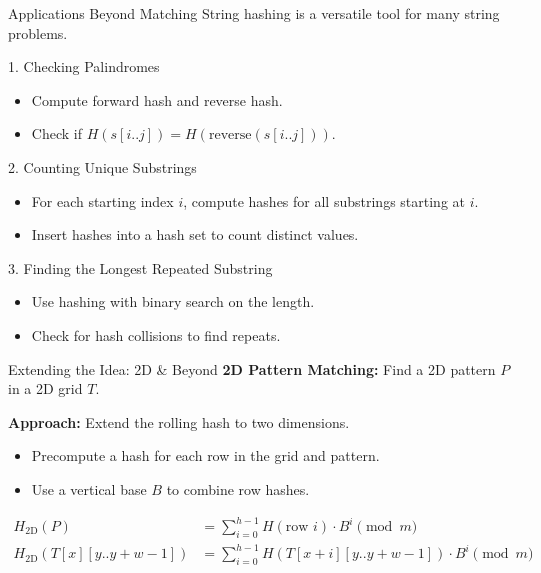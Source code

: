 \documentclass{beamer}
\begin{document}
\begin{frame}{Applications Beyond Matching}
    String hashing is a versatile tool for many string problems.

    \begin{block}{1. Checking Palindromes}
        \begin{itemize}
            \item Compute \alert{forward hash} and \alert{reverse hash}.
            \item Check if $H(s[i..j]) = H(\text{reverse}(s[i..j]))$.
        \end{itemize}
    \end{block}

    \begin{block}{2. Counting Unique Substrings}
        \begin{itemize}
            \item For each starting index $i$, compute hashes for all substrings starting at $i$.
            \item Insert hashes into a \alert{hash set} to count distinct values.
        \end{itemize}
    \end{block}

    \begin{block}{3. Finding the Longest Repeated Substring}
        \begin{itemize}
            \item Use hashing with \alert{binary search} on the length.
            \item Check for hash collisions to find repeats.
        \end{itemize}
    \end{block}
\end{frame}

\begin{frame}{Extending the Idea: 2D \& Beyond}
    \textbf{2D Pattern Matching:} Find a 2D pattern $P$ in a 2D grid $T$.

    \vspace{5pt}
    \textbf{Approach:} Extend the rolling hash to two dimensions.
    \begin{itemize}
        \item Precompute a hash for each row in the grid and pattern.
        \item Use a \alert{vertical base} $B$ to combine row hashes.
    \end{itemize}
    \begin{small}
    \begin{align*}
        H_{\text{2D}}(P) &= \sum_{i=0}^{h-1} H(\text{row } i) \cdot B^{i} \pmod{m} \\
        H_{\text{2D}}(T[x][y..y+w-1]) &= \sum_{i=0}^{h-1} H(T[x+i][y..y+w-1]) \cdot B^{i} \pmod{m}
    \end{align*}
    \end{small}

\end{frame}
\end{document}
